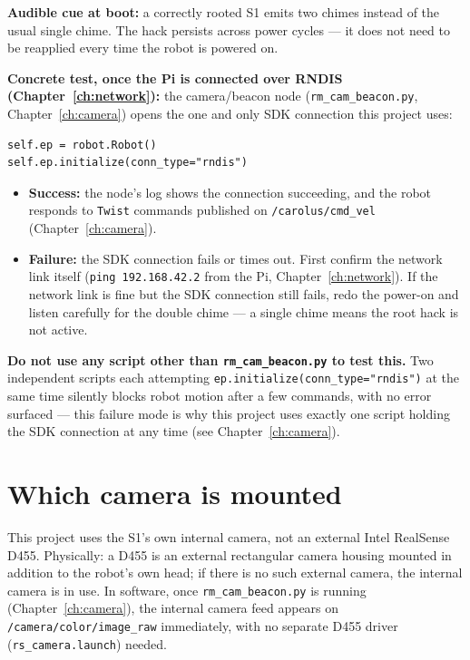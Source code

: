 \documentclass[11pt]{report}
\begin{document}
\textbf{Audible cue at boot:} a correctly rooted S1 emits two chimes instead
of the usual single chime. The hack persists across power cycles --- it does
not need to be reapplied every time the robot is powered on.

\textbf{Concrete test, once the Pi is connected over RNDIS
(Chapter~\ref{ch:network}):} the camera/beacon node
(\texttt{rm\_cam\_beacon.py}, Chapter~\ref{ch:camera}) opens the one and
only SDK connection this project uses:

\begin{lstlisting}[style=code]
self.ep = robot.Robot()
self.ep.initialize(conn_type="rndis")
\end{lstlisting}

\begin{itemize}
  \item \textbf{Success:} the node's log shows the connection succeeding, and
  the robot responds to \texttt{Twist} commands published on
  \texttt{/carolus/cmd\_vel} (Chapter~\ref{ch:camera}).
  \item \textbf{Failure:} the SDK connection fails or times out. First
  confirm the network link itself (\texttt{ping 192.168.42.2} from the Pi,
  Chapter~\ref{ch:network}). If the network link is fine but the SDK
  connection still fails, redo the power-on and listen carefully for the
  double chime --- a single chime means the root hack is not active.
\end{itemize}

\textbf{Do not use any script other than \texttt{rm\_cam\_beacon.py} to test
this.} Two independent scripts each attempting
\texttt{ep.initialize(conn\_type="rndis")} at the same time silently blocks
robot motion after a few commands, with no error surfaced --- this failure
mode is why this project uses exactly one script holding the SDK connection
at any time (see Chapter~\ref{ch:camera}).

\section{Which camera is mounted}

This project uses the S1's own internal camera, not an external Intel
RealSense D455. Physically: a D455 is an external rectangular camera housing
mounted in addition to the robot's own head; if there is no such external
camera, the internal camera is in use. In software, once
\texttt{rm\_cam\_beacon.py} is running (Chapter~\ref{ch:camera}), the
internal camera feed appears on \texttt{/camera/color/image\_raw}
immediately, with no separate D455 driver (\texttt{rs\_camera.launch})
needed.
\end{document}
